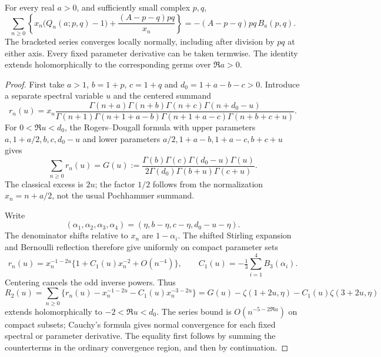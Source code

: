 \begin{theorem}\label{mx:generator}
For every real $a>0$, and sufficiently small complex $p,q$,
\begin{equation}\label{mx:generator-eq}
 \sum_{n\ge0}\left\{
 x_n\bigl(Q_n(a;p,q)-1\bigr)+\frac{(A-p-q)pq}{x_n}\right\}
 =-(A-p-q)pq\,B_a(p,q).
\end{equation}
The bracketed series converges locally normally, including after
division by $pq$ at either axis. Every fixed parameter derivative
can be taken termwise. The identity extends holomorphically to the
corresponding germs over $\Re a>0$.
\end{theorem}
\begin{proof}
First take $a>1$, $b=1+p$, $c=1+q$ and $d_0=1+a-b-c>0$.
Introduce a separate spectral variable $u$ and the centered summand
\[
 r_n(u)=x_n\frac{\Gamma(n+a)\Gamma(n+b)\Gamma(n+c)\Gamma(n+d_0-u)}
 {\Gamma(n+1)\Gamma(n+1+a-b)\Gamma(n+1+a-c)\Gamma(n+b+c+u)}.
\]
For $0<\Re u<d_0$, the Rogers--Dougall formula with upper parameters
$a,1+a/2,b,c,d_0-u$ and lower parameters
$a/2,1+a-b,1+a-c,b+c+u$ gives
\begin{equation}\label{mx:dougall-normalized}
 \sum_{n\ge0}r_n(u)=
 G(u):=\frac{\Gamma(b)\Gamma(c)\Gamma(d_0-u)\Gamma(u)}
 {2\Gamma(d_0)\Gamma(b+u)\Gamma(c+u)}.
\end{equation}
The classical excess is $2u$; the factor $1/2$ follows from the
normalization $x_n=n+a/2$, not the usual Pochhammer summand.

Write
\[
 (\alpha_1,\alpha_2,\alpha_3,\alpha_4)
 =(\eta,b-\eta,c-\eta,d_0-u-\eta).
\]
The denominator shifts relative to $x_n$ are $1-\alpha_i$.
The shifted Stirling expansion \cite{hstruct:DLMF} and Bernoulli
reflection therefore give uniformly on compact parameter sets
\[
 r_n(u)=x_n^{-1-2u}\{1+C_1(u)x_n^{-2}+O(n^{-4})\},\qquad
 C_1(u)=-\tfrac13\sum_{i=1}^4 B_3(\alpha_i).
\]
Centering cancels the odd inverse powers. Thus
\begin{equation}\label{mx:subtracted}
 R_2(u)=\sum_{n\ge0}
 \{r_n(u)-x_n^{-1-2u}-C_1(u)x_n^{-3-2u}\}
 =G(u)-\zeta(1+2u,\eta)-C_1(u)\zeta(3+2u,\eta)
\end{equation}
extends holomorphically to $-2<\Re u<d_0$. The series bound is
$O(n^{-5-2\Re u})$ on compact subsets; Cauchy's formula gives
normal convergence for each fixed spectral or parameter derivative.
The equality first follows by summing the counterterms in the
ordinary convergence region, and then by continuation.


\end{proof}
